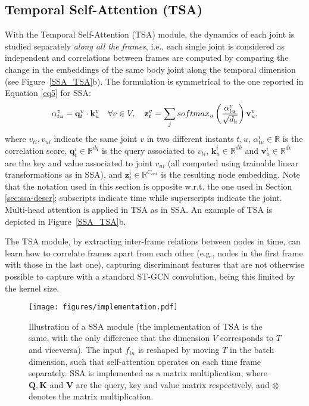 \documentclass[times,twocolumn,final,authoryear]{elsarticle}
\begin{document}
\subsection{Temporal Self-Attention (TSA)}\label{sec:st}

With the Temporal Self-Attention (TSA) module, the dynamics of each joint is studied separately \textit{along all the frames}, i.e., each single joint is considered as independent and correlations between frames are computed by comparing the change in the embeddings of the same body joint along the temporal dimension (see Figure~\ref{SSA_TSA}b). The formulation is symmetrical to the one reported in Equation \eqref{eq5} for SSA:
\begin{equation}
\alpha^v_{tu} =\mathbf{q}^v_{t} \cdot {\mathbf{k}^v_{u}} \quad \forall v \in V ,\quad
    \mathbf{z}^v_{t} =\sum_j{softmax_u\left(\frac{\alpha^v_{tu}}{\sqrt{d\textsubscript{k}}}\right)  \mathbf{v}^v_u},
\end{equation}
where $v_{ti}, v_{ui}$ indicate the same joint $v$ in two different instants $t, u$, $\alpha^i_{tu} \in \mathbb{R}$ is the correlation score, $\mathbf{q}^i_t \in \mathbb{R}^{dq}$ is the query associated to $v_{ti}$, $\mathbf{k}^i_u \in \mathbb{R}^{dk}$ and $\mathbf{v}^i_u \in \mathbb{R}^{dv}$ are the key and value associated to joint $v_{ui}$ (all computed using trainable linear transformations as in SSA), and $\mathbf{z}^i_t \in \mathbb{R}^{C_{out}}$ is the resulting node embedding. Note that  the notation used in this section is opposite w.r.t. the one used in Section \ref{sec:ssa-descr}; subscripts indicate time while superscripts indicate the joint. Multi-head attention is applied in TSA as in SSA. An example of TSA is depicted in Figure~\ref{SSA_TSA}b.

The TSA module, by extracting inter-frame relations between nodes in time, can learn how to correlate frames apart from each other (e.g., nodes in the first frame with those in the last one), capturing discriminant features that are not otherwise possible to capture with a standard ST-GCN convolution, being this limited by the kernel size.




\begin{figure}[t]
    \centering
    \texttt{[image: figures/implementation.pdf]}
    \caption{Illustration of a SSA module (the implementation of TSA is the same, with the only difference that the dimension $V$ corresponds to $T$ and viceversa). The input $f_{in}$ is reshaped by moving $T$ in the batch dimension, such that self-attention operates on each time frame separately. SSA is implemented as a matrix multiplication, where $\mathbf{Q}, \mathbf{K}$ and $\mathbf{V}$ are the query, key and value matrix respectively, and $\otimes$ denotes the matrix multiplication. }
    \label{implementation}
\end{figure}
\end{document}
